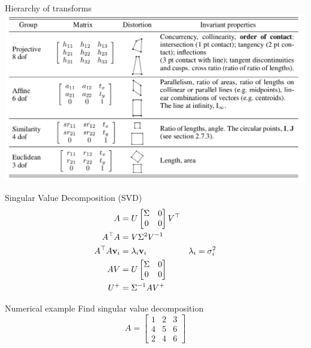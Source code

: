 \documentclass[times,t]{beamer}
\begin{document}
\begin{frame}{Hierarchy of transforms}
  \includegraphics[width=\linewidth]{media/hierarchy-of-transforms.png}
\end{frame}

\begin{frame}
\end{frame}

\begin{frame}{Singular Value  Decomposition (SVD)}
  \begin{align}
    A  &=   U  \begin{bmatrix}\Sigma   &  0  \\   0  &  0 \end{bmatrix} V^\top \\
    A^\top A &= V \Sigma^2  V^{-1} \\
    A^\top A \mathbf{v}_i  &= \lambda_i \mathbf{v}_i & \lambda_i = \sigma_i^2\\
    A V   &= U \begin{bmatrix}\Sigma   &  0  \\   0  &  0 \end{bmatrix}\\
    U^+   &=  \Sigma^{-1}AV^+
    \end{align}
\end{frame}

\begin{frame}{Numerical example}
  Find singular value decomposition
  \[
    A   =  \begin{bmatrix}
      1 &   2  &  3  \\
      4 & 5 &   6 \\
      2 & 4 &   6
    \end{bmatrix}
  \]
\end{frame}
\end{document}
